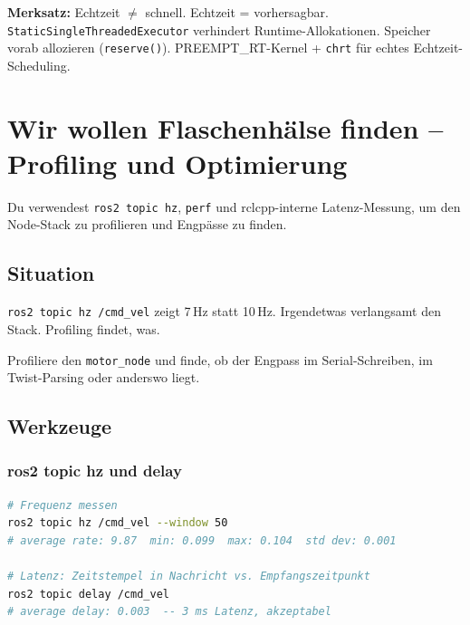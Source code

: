 \begin{merksatzBox}
\textbf{Merksatz:}
Echtzeit $\neq$ schnell. Echtzeit = vorhersagbar.
\texttt{StaticSingleThreadedExecutor} verhindert Runtime-Allokationen.
Speicher vorab allozieren (\texttt{reserve()}).
PREEMPT\_RT-Kernel + \texttt{chrt} für echtes Echtzeit-Scheduling.
\end{merksatzBox}


\chapter{Wir wollen Flaschenhälse finden –
  Profiling und Optimierung}

\begin{lernziele}
Du verwendest \texttt{ros2 topic hz}, \texttt{perf} und
rclcpp-interne Latenz-Messung, um den Node-Stack zu profilieren
und Engpässe zu finden.
\end{lernziele}

\section{Situation}

\texttt{ros2 topic hz /cmd\_vel} zeigt 7\,Hz statt 10\,Hz.
Irgendetwas verlangsamt den Stack.
Profiling findet, was.

\begin{aufgabeBox}
Profiliere den \texttt{motor\_node} und finde, ob der Engpass
im Serial-Schreiben, im Twist-Parsing oder anderswo liegt.
\end{aufgabeBox}

\section{Werkzeuge}

\subsection{ros2 topic hz und delay}

\begin{lstlisting}[language=bash]
# Frequenz messen
ros2 topic hz /cmd_vel --window 50
# average rate: 9.87  min: 0.099  max: 0.104  std dev: 0.001

# Latenz: Zeitstempel in Nachricht vs. Empfangszeitpunkt
ros2 topic delay /cmd_vel
# average delay: 0.003  -- 3 ms Latenz, akzeptabel
\end{lstlisting}

